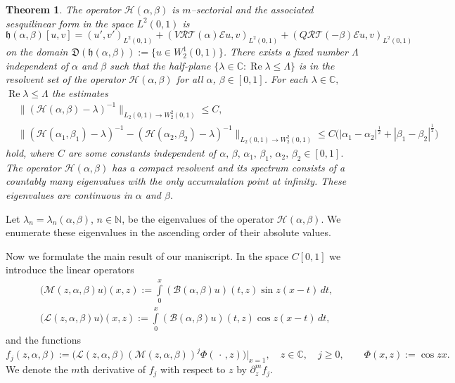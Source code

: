 \documentclass[10pt, a4paper]{article}
\theoremstyle{plain}
\newtheorem{theorem}{Theorem}
\theoremstyle{definition}
\numberwithin{equation}{section}
\def\l{\lambda}
\def\p{\partial}
\def\a{\alpha}
\def\b{\beta}
\def\L{\Lambda}
\def\Op{\mathcal{H}}
\def\cE{\mathcal{E}}
\def\cL{\mathcal{L}}
\DeclareMathOperator{\RE}{Re}
\renewcommand{\geq}{\geqslant}
\begin{document}
\begin{theorem}\label{th0}
The operator $\mathcal{H}(\alpha, \beta)$ is $m$--sectorial and the associated sesquilinear
form in the space $L^2(0, 1)$ is
\begin{equation}\label{2.1}
\mathfrak{h}(\alpha, \beta)[u, v]=(u', v')_{L^2(0, 1)}
+(V\mathcal{R}\mathcal{T}(\alpha)\cE u, v)_{L^2(0, 1)}
+(Q\mathcal{R}\mathcal{T}(-\beta)\cE u, v)_{L^2(0, 1)}
\end{equation}
on the domain $\mathfrak{D}(\mathfrak{h}(\alpha, \beta)):=\{u\in W_2^1(0, 1)\}$.
There exists a fixed number $\Lambda$ independent of $\alpha$ and $\beta$ such
that the half-plane $\{\lambda\in\mathds{C}: \RE \lambda\leqslant \Lambda\}$ is in the resolvent  set of the operator $\mathcal{H}(\alpha, \beta)$ for all $\alpha$, $\beta\in [0, 1]$. For each $\l\in\mathds{C},$ $\RE\l\leqslant \L$ the estimates
\begin{equation}\label{2.3}
\begin{aligned}
&\|(\Op(\a,\b)-\l)^{-1}\|_{L_2(0,1)\to W_2^2(0,1)}\leqslant C,
\\
&\|(\Op(\a_1,\b_1)-\l)^{-1}-(\Op(\a_2,\b_2)-\l)^{-1}\|_{L_2(0,1)\to W_2^2(0,1)}\leqslant C\big(|\a_1-\a_2|^\frac{1}{2}+|\b_1-\b_2|^\frac{1}{2}\big)
\end{aligned}
\end{equation}
hold, where $C$ are some constants independent of $\a,\,\b,\,\a_1,\,\b_1,\,\a_2,\,\b_2\in[0,1].$
The operator $\mathcal{H}(\alpha, \beta)$ has a compact resolvent and its spectrum consists of a countably many eigenvalues with the only accumulation point at infinity. These eigenvalues are continuous in $\a$ and $\b.$
\end{theorem}

Let $\lambda_n=\l_n(\a,\b)$, $n\in\mathds{N}$, be the eigenvalues of the operator $\mathcal{H}(\alpha, \beta)$. We enumerate
these eigenvalues in the ascending order of their absolute values.

Now we formulate the main result of our maniscript. In the space $C[0, 1]$ we introduce the linear operators
\begin{equation}\label{OperM}
\begin{aligned}
&\big(\mathcal{M}(z,\alpha, \beta)u\big)(x, z):= \int\limits_0^x(\mathcal{B}(\alpha, \beta)u)(t, z)\sin z(x-t)\,dt, \\
&\big(\cL(z,\alpha, \beta)u\big)(x, z):=
\int\limits_0^{x}(\mathcal{B}(\alpha, \beta)u)(t, z)\cos z(x-t)\,dt,
\end{aligned}
\end{equation}
and the functions
\begin{equation}\label{fj}
f_j(z,\alpha, \beta):=\Big(\cL(z,\alpha, \beta)(\mathcal{M}(z,\alpha, \beta))^j\Phi(\,\cdot\,,z)\Big)\big|_{x=1},
\quad z\in\mathds{C},\quad  j\geq 0, \qquad \Phi(x,z):=\cos zx.
\end{equation}
We denote the $m$th derivative of $f_j$ with respect to  $z$ by $\p_z^m f_j.$
\end{document}
